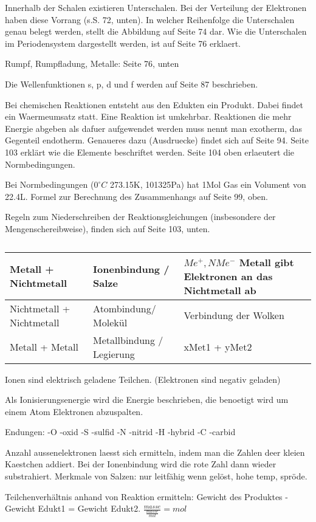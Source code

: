 \documentclass[11pt,paper=a4,final]{scrartcl}
\begin{document}
Innerhalb der Schalen existieren Unterschalen. Bei der Verteilung der Elektronen
haben diese Vorrang (s.S. 72, unten). In welcher Reihenfolge die Unterschalen
genau belegt werden, stellt die Abbildung auf Seite 74 dar. Wie die Unterschalen
im Periodensystem dargestellt werden, ist auf Seite 76 erklaert.

Rumpf, Rumpfladung, Metalle: Seite 76, unten

Die Wellenfunktionen s, p, d und f werden auf Seite 87 beschrieben.

Bei chemischen Reaktionen entsteht aus den Edukten ein Produkt. Dabei findet ein
Waermeumsatz statt. Eine Reaktion ist umkehrbar. Reaktionen die mehr Energie
abgeben als dafuer aufgewendet werden muss nennt man exotherm, das Gegenteil
endotherm. Genaueres dazu (Ausdruecke) findet sich auf Seite 94. Seite 103
erkl\"art wie die Elemente beschriftet werden. Seite 104 oben erlaeutert die
Normbedingungen.

Bei Normbedingungen (\(0^{\circ}C\) 273.15K, 101325Pa) hat 1Mol Gas ein Volument
von 22.4L. Formel zur Berechnung des Zusammenhangs auf Seite 99, oben.

Regeln zum Niederschreiben der Reaktionsgleichungen (insbesondere der
Mengenschereibweise), finden sich auf Seite 103, unten.
\begin{table}[h!]
  \centering
  \begin{tabular}{|l|l|p{6cm}|}\hline
    Metall + Nichtmetall & Ionenbindung / Salze & \(Me^+, NMe^- \) Metall gibt
    Elektronen an das Nichtmetall ab\\ \hline
    Nichtmetall + Nichtmetall & Atombindung/ Molek\"ul & Verbindung der Wolken
    \\ \hline
    Metall + Metall & Metallbindung / Legierung & xMet1 + yMet2 \\ \hline
  \end{tabular}
  \caption{}
  \label{tab:}
\end{table}
Ionen sind elektrisch geladene Teilchen. (Elektronen sind negativ geladen)

Als Ionisierungsenergie wird die Energie beschrieben, die benoetigt wird um
einem Atom Elektronen abzuspalten.

Endungen: -O -oxid -S -sulfid -N -nitrid -H -hybrid -C -carbid

Anzahl aussenelektronen laesst sich ermitteln, indem man die Zahlen deer kleien
Kaestchen addiert. Bei der Ionenbindung wird die rote Zahl dann wieder
substrahiert.
Merkmale von Salzen: nur leitf\"ahig wenn gel\"ost, hohe temp, spr\"ode.

Teilchenverh\"altnis anhand von Reaktion ermitteln: Gewicht des Produktes -
Gewicht Edukt1 = Gewicht Edukt2.
\(\frac{masse}{\frac{masse}{mol}} = mol \)
\end{document}
